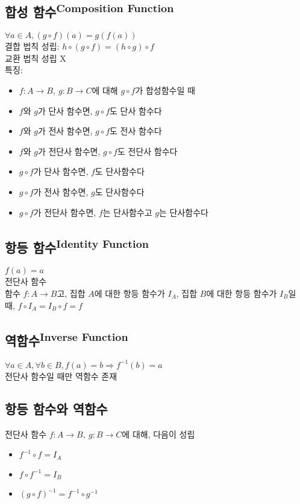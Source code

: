 \subsection{합성 함수\textsuperscript{Composition Function}}
$\forall a \in A, (g \circ f)(a) = g(f(a))$\\
결합 법칙 성립: $h\circ(g\circ f) = (h \circ g)\circ f$\\
교환 법칙 성립 X\\
특징:
\begin{itemize}
    \item $f:A \to B,\ g: B \to C$에 대해 $g \circ f$가 합성함수일 때
    \item $f$와 $g$가 단사 함수면, $g\circ f$도 단사 함수다
    \item $f$와 $g$가 전사 함수면, $g\circ f$도 전사 함수다
    \item $f$와 $g$가 전단사 함수면, $g\circ f$도 전단사 함수다
    \item $g\circ f$가 단사 함수면, $f$도 단사함수다
    \item $g\circ f$가 전사 함수면, $g$도 단사함수다
    \item $g\circ f$가 전단사 함수면, $f$는 단사함수고 $g$는 단사함수다
\end{itemize}

\subsection{항등 함수\textsuperscript{Identity Function}}
$f(a) = a$\\
전단사 함수\\
함수 $f: A \to B$고, 집합 $A$에 대한 항등 함수가 $I_A$, 집합 $B$에 대한 항등 함수가 $I_B$일 때,
$f \circ I_A = I_B \circ f = f$

\subsection{역함수\textsuperscript{Inverse Function}}
$\forall a \in A, \forall b \in B, f(a)=b \Rightarrow f^{-1}(b) = a$\\
전단사 함수일 때만 역함수 존재

\subsection{항등 함수와 역함수}
전단사 함수 $f: A \to B,\ g: B \to C$에 대해, 다음이 성립
\begin{itemize}
    \item $f^{-1} \circ f = I_A$
    \item $f \circ f^{-1} = I_B$
    \item $(g \circ f)^{-1} = f^{-1} \circ g^{-1}$
\end{itemize}

